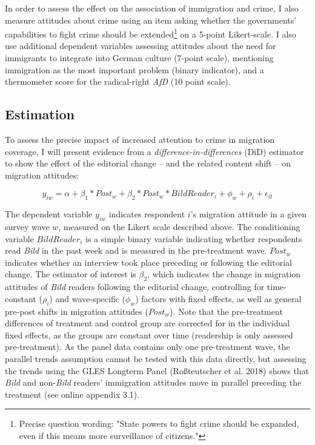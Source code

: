 \documentclass[
  12pt,
]{article}
\begin{document}
In order to assess the effect on the association of immigration and crime, I also measure attitudes about crime using an item asking whether the governments' capabilities to fight crime should be extended\footnote{Precise question wording: "State powers to fight crime should be expanded, even if this means more surveillance of citizens."} on a 5-point Likert-scale. I also use additional dependent variables assessing attitudes about the need for immigrants to integrate into German culture (7-point scale), mentioning immigration as the most important problem (binary indicator), and a thermometer score for the radical-right \emph{AfD} (10 point scale).

\hypertarget{estimation}{%
\subsection{Estimation}\label{estimation}}

To assess the precise impact of increased attention to crime in migration coverage, I will present evidence from a \emph{difference-in-differences} (DiD) estimator to show the effect of the editorial change -- and the related content shift -- on migration attitudes:

\[
y_{iw} = \alpha + \beta_1*Post_w + \beta_2 * Post_w * BildReader_i + \phi_w + \rho_i + \epsilon_{it} 
\]

The dependent variable \(y_{iw}\) indicates respondent \(i\)'s migration attitude in a given survey wave \(w\), measured on the Likert scale described above. The conditioning variable \(BildReader_i\) is a simple binary variable indicating whether respondents read \emph{Bild} in the past week and is measured in the pre-treatment wave. \(Post_w\) indicates whether an interview took place preceding or following the editorial change. The estimator of interest is \(\beta_2\), which indicates the change in migration attitudes of \emph{Bild} readers following the editorial change, controlling for time-constant (\(\rho_i\)) and wave-specific (\(\phi_w\)) factors with fixed effects, as well as general pre-post shifts in migration attitudes (\(Post_w\)). Note that the pre-treatment differences of treatment and control group are corrected for in the individual fixed effects, as the groups are constant over time (readership is only assessed pre-treatment). As the panel data contains only one pre-treatment wave, the parallel trends assumption cannot be tested with this data directly, but assessing the trends using the GLES Longterm Panel (Roßteutscher et al. 2018) shows that \emph{Bild} and non-\emph{Bild} readers' immigration attitudes move in parallel preceding the treatment (see online appendix 3.1).
\end{document}
